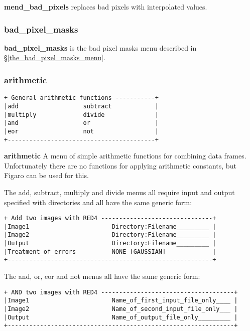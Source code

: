 {{\bf mend\_bad\_pixels} replaces bad pixels with interpolated values.

\subsubsection{bad\_pixel\_masks}

{\bf bad\_pixel\_masks} is the bad pixel masks menu described 
in \S \ref{the_bad_pixel_masks_menu}.

\subsubsection{arithmetic}
\label{arithmetic_1}
\begin{verbatim}
+ General arithmetic functions -----------+
|add                  subtract            |
|multiply             divide              |
|and                  or                  |
|eor                  not                 |
+-----------------------------------------+
\end{verbatim}

{\bf arithmetic} A menu of simple arithmetic functions for combining 
data frames. Unfortunately there are no functions for applying arithmetic 
constants, but Figaro can be used for this.

The {\sf add}, {\sf subtract}, {\sf multiply} and {\sf divide} menus
all require input and output specified with directories and all have 
the same generic form:

\begin{verbatim}
+ Add two images with RED4 -------------------------------+
|Image1                       Directory:Filename_________ |
|Image2                       Directory:Filename_________ |
|Output                       Directory:Filename_________ |
|Treatment_of_errors          NONE [GAUSSIAN]             |
+---------------------------------------------------------+
\end{verbatim}

The {\sf and}, {\sf or}, {\sf eor} and {\sf not} menus
all have the same generic form:

\begin{verbatim}
+ AND two images with RED4 -------------------------------------+
|Image1                       Name_of_first_input_file_only____ |
|Image2                       Name_of_second_input_file_only___ |
|Output                       Name_of_output_file_only_________ |
+---------------------------------------------------------------+
\end{verbatim}

}
